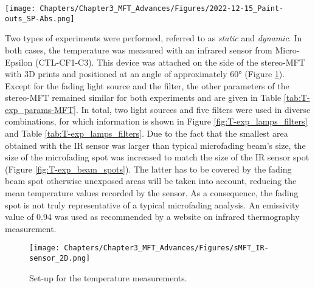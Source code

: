 \begin{figure*}
\centering
\texttt{[image: Chapters/Chapter3\_MFT\_Advances/Figures/2022-12-15\_Paint-outs\_SP-Abs.png]}
\caption[\hspace{0.3cm}Absorption spectra of the samples]{Absorption spectra of the samples.}
\label{fig:T-exp_PO_absp-SP}
\end{figure*}


Two types of experiments were performed, referred to as \textit{static} and \textit{dynamic}. In both cases, the temperature was measured with an infrared sensor from Micro-Epsilon (CTL-CF1-C3). This device was attached on the side of the stereo-MFT with 3D prints and positioned at an angle of approximately \ang{60} (Figure \ref{fig:T-exp_MFT_setup}). Except for the fading light source and the filter, the other parameters of the stereo-MFT remained similar for both experiments and are given in Table \ref{tab:T-exp_params-MFT}. In total, two light sources and five filters were used in diverse combinations, for which information is shown in Figure \ref{fig:T-exp_lamps_filters} and Table \ref{tab:T-exp_lamps_filters}. Due to the fact that the smallest area obtained with the \gls{IR} sensor was larger than typical microfading beam's size, the size of the microfading spot was increased to match the size of the \gls{IR} sensor spot (Figure \ref{fig:T-exp_beam_spots}). The latter has to be covered by the fading beam spot otherwise unexposed areas will be taken into account, reducing the mean temperature values recorded by the sensor. As a consequence, the fading spot is not truly representative of a typical microfading analysis. An emissivity value of 0.94 was used as recommended by a website on infrared thermography measurement. \\

\vspace{1cm}

\begin{figure}[!h]
\centering
\texttt{[image: Chapters/Chapter3\_MFT\_Advances/Figures/sMFT\_IR-sensor\_2D.png]}
\caption[\hspace{0.3cm}Set-up for the temperature measurements.]{Set-up for the temperature measurements.}
\label{fig:T-exp_MFT_setup}
\end{figure}

